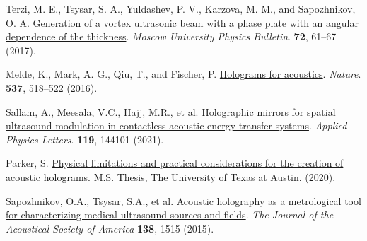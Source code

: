 \documentclass[12pt]{article}%
\begin{document}
\begin{thebibliography}{99}
Terzi, M. E., Tsysar, S. A., Yuldashev, P. V., Karzova, M. M., and Sapozhnikov, O. A. \href{https://doi.org/10.3103/S0027134916050180}{Generation of a vortex ultrasonic beam with a phase plate with an angular dependence of the thickness}. \textit{Moscow University Physics Bulletin}. \textbf{72}, 61–67 (2017).


Melde, K., Mark, A. G., Qiu, T., and Fischer, P. \href{https://doi.org/10.1038/nature19755}{Holograms for acoustics}. \textit{Nature}. \textbf{537}, 518–522 (2016).

Sallam, A., Meesala, V.C., Hajj, M.R., et al. \href{https://doi.org/10.1063/5.0065489}{Holographic mirrors for spatial ultrasound modulation in contactless acoustic energy transfer systems}.  \textit{Applied Physics Letters}. \textbf{119}, 144101 (2021).

Parker, S. \href{https://hdl.handle.net/2152/87049}{Physical limitations and practical considerations for the creation of acoustic holograms}. M.S. Thesis, The University of Texas at Austin. (2020).

Sapozhnikov, O.A., Tsysar, S.A., et al. \href{https://doi.org/10.1121/1.4928396}{Acoustic holography as a metrological tool for characterizing medical ultrasound sources and fields}. \textit{The Journal of the Acoustical Society of America} \textbf{138}, 1515 (2015). 


\end{thebibliography}
\end{document}

